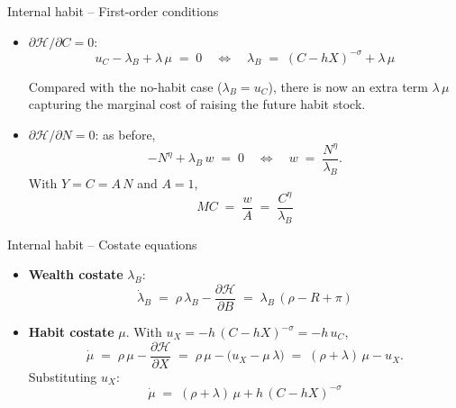 \documentclass[11pt,aspectratio=169]{beamer}
\begin{document}
\begin{frame}{Internal habit -- First-order conditions}

\begin{itemize}

\item $\partial\mathcal H / \partial C = 0$:
  \[
  u_C - \lambda_B + \lambda\,\mu \;=\; 0
  \quad\Longleftrightarrow\quad
  \boxed{\lambda_B \;=\; (C - hX)^{-\sigma} + \lambda\,\mu}
  \]

  Compared with the no-habit case ($\lambda_B = u_C$), there is now an
  extra term $\lambda\,\mu$ capturing the marginal cost of raising the
  future habit stock.\newline

\item $\partial\mathcal H / \partial N = 0$: as before,
  \[
  -N^\eta + \lambda_B\,w \;=\; 0
  \quad\Longleftrightarrow\quad
  w \;=\; \frac{N^\eta}{\lambda_B}.
  \]
  With $Y=C=A\,N$ and $A=1$,
  \[
  \boxed{MC \;=\; \frac{w}{A} \;=\; \frac{C^\eta}{\lambda_B}}
  \]

\end{itemize}

\end{frame}

\begin{frame}{Internal habit -- Costate equations}

\begin{itemize}

\item \textbf{Wealth costate} $\lambda_B$:
  \[
  \boxed{\dot\lambda_B \;=\; \rho\,\lambda_B - \frac{\partial\mathcal H}{\partial B}
  \;=\; \lambda_B\,(\rho - R + \pi)}
  \]

\medskip
  
\item \textbf{Habit costate} $\mu$. With
  $u_X = -h\,(C - hX)^{-\sigma} = -h\,u_C$,
  \[
  \dot\mu \;=\; \rho\,\mu - \frac{\partial\mathcal H}{\partial X}
  \;=\; \rho\,\mu - \bigl(u_X - \mu\,\lambda\bigr)
  \;=\; (\rho + \lambda)\,\mu - u_X.
  \]
  Substituting $u_X$:
  \[
  \boxed{\dot\mu \;=\; (\rho + \lambda)\,\mu + h\,(C - hX)^{-\sigma}}
  \]

\end{itemize}

\end{frame}
\end{document}
